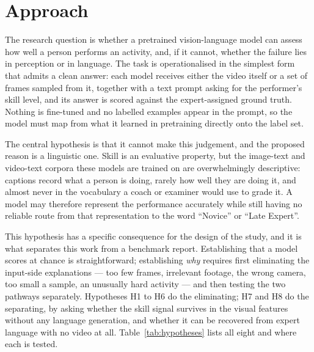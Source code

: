 \documentclass[logo,msc]{infthesis}
\begin{document}
\section{Approach}

The research question is whether a pretrained vision-language model can
assess how well a person performs an activity, and, if it cannot, whether
the failure lies in perception or in language. The task is operationalised
in the simplest form that admits a clean answer: each model receives either
the video itself or a set of frames sampled from it, together with a text
prompt asking for the performer's skill level, and its answer is scored
against the expert-assigned ground truth. Nothing is fine-tuned and no
labelled examples appear in the prompt, so the model must map from what it
learned in pretraining directly onto the label set.

The central hypothesis is that it cannot make this judgement, and the
proposed reason is a linguistic one. Skill is an evaluative property, but
the image-text and video-text corpora these models are trained on are
overwhelmingly descriptive: captions record what a person is doing, rarely
how well they are doing it, and almost never in the vocabulary a coach or
examiner would use to grade it. A model may therefore represent the
performance accurately while still having no reliable route from that
representation to the word ``Novice'' or ``Late Expert''.

This hypothesis has a specific consequence for the design of the study, and
it is what separates this work from a benchmark report. Establishing that a
model scores at chance is straightforward; establishing \emph{why} requires
first eliminating the input-side explanations --- too few frames, irrelevant
footage, the wrong camera, too small a sample, an unusually hard activity ---
and then testing the two pathways separately. Hypotheses H1 to H6 do the
eliminating; H7 and H8 do the separating, by asking whether the skill signal
survives in the visual features without any language generation, and whether
it can be recovered from expert language with no video at all.
Table~\ref{tab:hypotheses} lists all eight and where each is tested.
\end{document}
